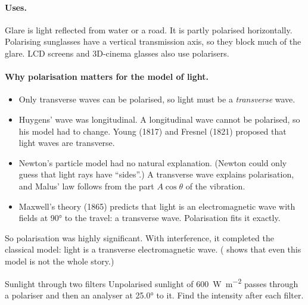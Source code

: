 \paragraph{Uses.} Glare is light reflected from water or a road. It is partly polarised
horizontally. Polarising sunglasses have a vertical transmission axis, so they block much
of the glare. LCD screens and 3D-cinema glasses also use polarisers.

\paragraph{Why polarisation matters for the model of light.}
\begin{itemize}
  \item Only transverse waves can be polarised, so light must be a \emph{transverse} wave.
  \item Huygens' wave was longitudinal. A longitudinal wave cannot be polarised, so his
        model had to change. Young (1817) and Fresnel (1821) proposed that light waves are
        transverse.
  \item Newton's particle model had no natural explanation. (Newton could only guess that
        light rays have ``sides''.) A transverse wave explains polarisation, and Malus' law
        follows from the part $A\cos\theta$ of the vibration.
  \item Maxwell's theory (1865) predicts that light is an electromagnetic wave with fields at
        \ang{90} to the travel: a transverse wave. Polarisation fits it exactly.
\end{itemize}
So polarisation was highly significant. With interference, it completed the classical
model: light is a transverse electromagnetic wave. ( shows that even this
model is not the whole story.)

\begin{workedexample}{Sunlight through two filters}\label{ch2:we:two}
Unpolarised sunlight of \qty{600}{W.m^{-2}} passes through a polariser and then an
analyser at \ang{25.0} to it. Find the intensity after each filter.
\end{workedexample}


